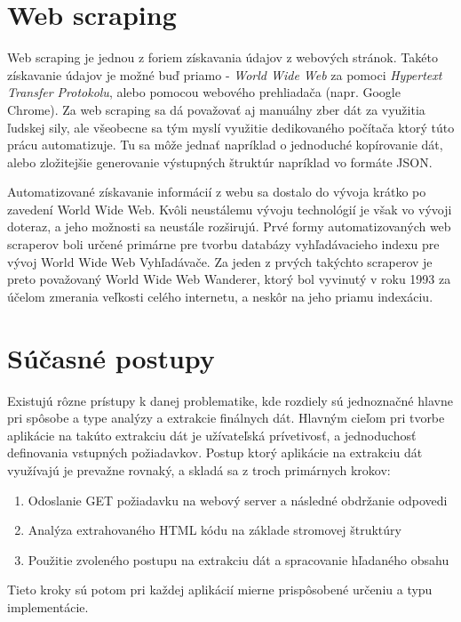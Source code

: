 \section{Web scraping}

Web scraping je jednou z foriem získavania údajov z webových stránok. Takéto získavanie údajov je možné buď priamo - \textit{World Wide Web} za pomoci \textit{Hypertext Transfer Protokolu}, alebo pomocou webového prehliadača (napr. Google Chrome). Za web scraping sa dá považovať aj manuálny zber dát za využitia ľudskej sily, ale všeobecne sa tým myslí využitie dedikovaného počítača ktorý túto prácu automatizuje. Tu sa môže jednať napríklad o jednoduché kopírovanie dát, alebo zložitejšie generovanie výstupných štruktúr napríklad vo formáte JSON.

Automatizované získavanie informácií z webu sa dostalo do vývoja krátko po zavedení World Wide Web. Kvôli neustálemu vývoju technológií je však vo vývoji doteraz, a jeho možnosti sa neustále rozširujú. Prvé formy automatizovaných web scraperov boli určené primárne pre tvorbu databázy vyhľadávacieho indexu pre vývoj World Wide Web Vyhľadávače. Za jeden z prvých takýchto scraperov je preto považovaný World Wide Web Wanderer, ktorý bol vyvinutý v roku 1993 za účelom zmerania veľkosti celého internetu, a neskôr na jeho priamu indexáciu. \cite{online:how_does_scraping_work}

\section{Súčasné postupy}

Existujú rôzne prístupy k danej problematike, kde rozdiely sú jednoznačné hlavne pri spôsobe a type analýzy a extrakcie finálnych dát. Hlavným cieľom pri tvorbe aplikácie na takúto extrakciu dát je užívateľská prívetivosť, a jednoduchosť definovania vstupných požiadavkov. Postup ktorý aplikácie na extrakciu dát využívajú je prevažne rovnaký, a skladá sa z troch primárnych krokov:
\begin{enumerate}
  \item{Odoslanie GET požiadavku na webový server a následné obdržanie odpovedi}
  \item{Analýza extrahovaného HTML kódu na základe stromovej štruktúry}
  \item{Použitie zvoleného postupu na extrakciu dát a spracovanie hľadaného obsahu}
\end{enumerate}

Tieto kroky sú potom pri každej aplikácií mierne prispôsobené určeniu a typu implementácie. \cite{online:how_does_scraping_work}

